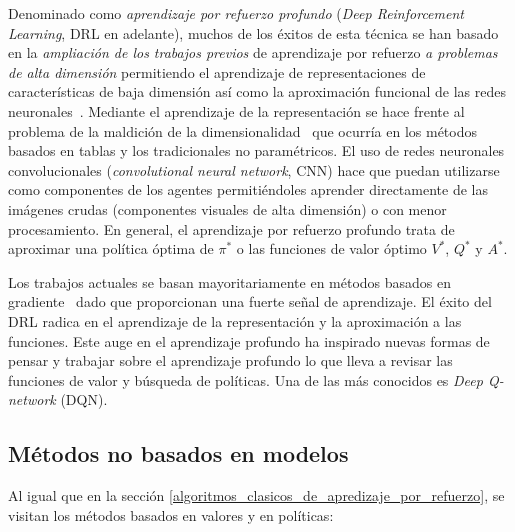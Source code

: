 Denominado como \textit{aprendizaje por refuerzo profundo} (\textit{Deep Reinforcement Learning}, DRL en adelante), muchos de los éxitos de esta técnica se han basado en la \textit{ampliación de los trabajos previos} de aprendizaje por refuerzo \textit{a problemas de alta dimensión} permitiendo el aprendizaje de representaciones de características de baja dimensión así como la aproximación funcional de las redes neuronales~\cite{kay_arulkumaran}. Mediante el aprendizaje de la representación se hace frente al problema de la maldición de la dimensionalidad~\cite{naveen_venkat} que ocurría en los métodos basados en tablas y los tradicionales no paramétricos. El uso de redes neuronales convolucionales (\textit{convolutional neural network}, CNN) hace que puedan utilizarse como componentes de los agentes permitiéndoles aprender directamente de las imágenes crudas (componentes visuales de alta dimensión) o con menor procesamiento. En general, el aprendizaje por refuerzo profundo trata de aproximar una política óptima de $\pi^*$ o las funciones de valor óptimo $V^*$, $Q^*$ y $A^*$.

\hfill\break
\noindent
Los trabajos actuales se basan mayoritariamente en métodos basados en gradiente~\cite{gradient} dado que proporcionan una fuerte señal de aprendizaje. El éxito del DRL radica en el aprendizaje de la representación y la aproximación a las funciones. Este auge en el aprendizaje profundo ha inspirado nuevas formas de pensar y trabajar sobre el aprendizaje profundo lo que lleva a revisar las funciones de valor y búsqueda de políticas. Una de las más conocidos es \textit{Deep Q-network} (DQN).

\subsection{Métodos no basados en modelos}

Al igual que en la sección \ref{algoritmos_clasicos_de_apredizaje_por_refuerzo}, se visitan los métodos basados en valores y en políticas:\\

